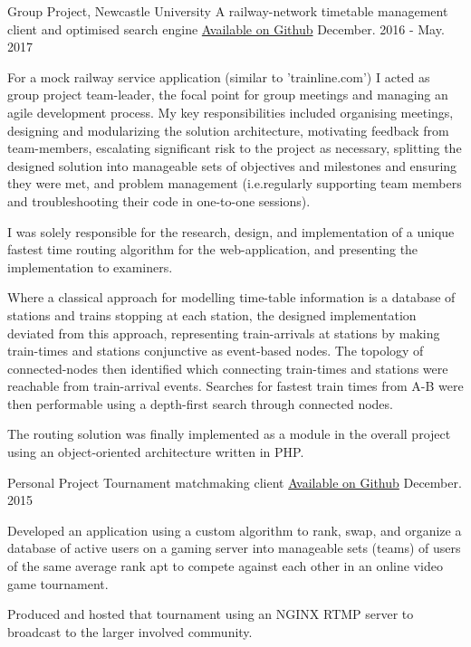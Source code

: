 \begin{cventries}
  \cventry
    {Group Project, Newcastle University} %
    {A railway-network timetable management client and optimised search engine} %
    {\href{https://github.com/mmacheerpuppy/routes}{Available on Github}} %
    {December. 2016 - May. 2017} %
    {
      \begin{cvitems} %
  \item {For a mock railway service application (similar to 'trainline.com') I acted as group project team-leader, the focal point for group meetings and managing an agile development process. My key responsibilities included organising meetings, designing and modularizing the solution architecture, motivating feedback from team-members, escalating significant risk to the project as necessary, splitting the designed solution into manageable sets of objectives and milestones and ensuring they were met, and problem management (i.e.regularly supporting team members and troubleshooting their code in one-to-one sessions).}
  \item {I was solely responsible for the research, design, and implementation of a unique fastest time routing algorithm for the web-application, and presenting the implementation to examiners.}
  \item {Where a classical approach for modelling time-table information is a database of stations and trains stopping at each station, the designed implementation deviated from this approach, representing train-arrivals at stations by making train-times and stations conjunctive as event-based nodes. The topology of connected-nodes then identified which connecting train-times and stations were reachable from train-arrival events. Searches for fastest train times from A-B were then performable using a depth-first search through connected nodes.}
  \item {The routing solution was finally implemented as a module in the overall project using an object-oriented architecture written in PHP.}
      \end{cvitems}
    }

  \cventry
    {Personal Project} %
    {Tournament matchmaking client} %
    {\href{https://github.com/mmacheerpuppy/matchmaker}{Available on Github}} %
    {December. 2015} %
    {
      \begin{cvitems} %
  \item {Developed an application using a custom algorithm to rank, swap, and organize a database of active users on a gaming server into manageable sets (teams) of users of the same average rank apt to compete against each other in an online video game tournament.}
  \item {Produced and hosted that tournament using an NGINX RTMP server to broadcast to the larger involved community.}
      \end{cvitems}
    }


\end{cventries}
